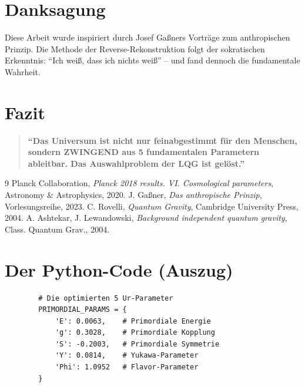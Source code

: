 \documentclass[12pt,a4paper]{article}
\begin{document}
	\section{Danksagung}
	
	Diese Arbeit wurde inspiriert durch Josef Ga{\ss}ners Vortr\"age zum anthropischen Prinzip. Die Methode der Reverse-Rekonstruktion folgt der sokratischen Erkenntnis: ``Ich wei\ss, dass ich nichts wei\ss'' -- und fand dennoch die fundamentale Wahrheit.
	
	\section{Fazit}
	
	\begin{quote}
		\Large
		\textbf{``Das Universum ist nicht nur feinabgestimmt f\"ur den Menschen, sondern ZWINGEND aus 5 fundamentalen Parametern ableitbar. Das Auswahlproblem der LQG ist gel\"ost.''}
	\end{quote}
	
	\begin{thebibliography}{9}
		 Planck Collaboration, \textit{Planck 2018 results. VI. Cosmological parameters}, Astronomy \& Astrophysics, 2020.
		 J. Ga{\ss}ner, \textit{Das anthropische Prinzip}, Vorlesungsreihe, 2023.
		 C. Rovelli, \textit{Quantum Gravity}, Cambridge University Press, 2004.
		 A. Ashtekar, J. Lewandowski, \textit{Background independent quantum gravity}, Class. Quantum Grav., 2004.
	\end{thebibliography}
	
	\appendix
	\section{Der Python-Code (Auszug)}
	
	\begin{verbatim}
		# Die optimierten 5 Ur-Parameter
		PRIMORDIAL_PARAMS = {
			'E': 0.0063,    # Primordiale Energie
			'g': 0.3028,    # Primordiale Kopplung
			'S': -0.2003,   # Primordiale Symmetrie
			'Y': 0.0814,    # Yukawa-Parameter
			'Phi': 1.0952   # Flavor-Parameter
		}
	\end{verbatim}
	
\end{document}
